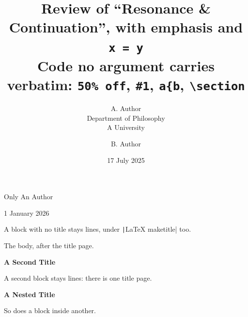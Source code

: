{\noindent\large Only An Author\par}

{\noindent\large 1 January 2026\par}\medskip

A block with no title stays lines, under \texttt|LaTeX maketitle| too.

\title{Review of “Resonance \& Continuation”, with \textbf{emphasis} and \texttt{x = y}\\{\large Code no argument carries verbatim: \texttt{50\% off}, \texttt{\#1}, \texttt{a\{b}, \texttt{\textbackslash{}section}}}
\author{A. Author\\Department of Philosophy\\A University \and B. Author}
\date{17 July 2025}
\maketitle

The body, after the title page.

{\noindent\LARGE\bfseries A Second Title\par}

A second block stays lines: there is one title page.

\begin{center}
{\noindent\LARGE\bfseries A Nested Title\par}
\end{center}

So does a block inside another.

